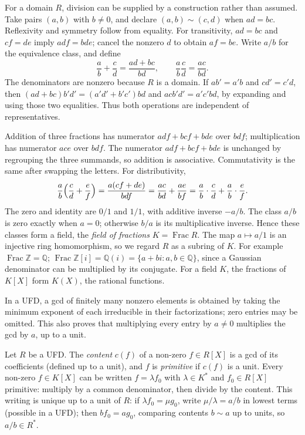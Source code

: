 For a domain $R$, division can be supplied by a construction rather
than assumed. Take pairs $(a,b)$ with $b\ne0$, and declare
$(a,b)\sim(c,d)$ when $ad=bc$. Reflexivity and symmetry follow
from equality. For transitivity, $ad=bc$ and $cf=de$ imply
$adf=bde$; cancel the nonzero $d$ to obtain $af=be$.
Write $a/b$ for the equivalence class, and define
\[
\frac ab+\frac cd=\frac{ad+bc}{bd},\qquad
\frac ab\frac cd=\frac{ac}{bd}.
\]
The denominators are nonzero because $R$ is a domain.
If $ab'=a'b$ and $cd'=c'd$, then
$(ad+bc)b'd'=(a'd'+b'c')bd$ and
$acb'd'=a'c'bd$, by expanding and using those two equalities.
Thus both operations are independent of representatives.

Addition of three fractions has numerator $adf+bcf+bde$ over
$ bdf$; multiplication has numerator $ace$ over $bdf$.
The numerator $adf+bcf+bde$ is unchanged by regrouping the three summands, so addition is associative. Commutativity is the same after swapping the letters. For distributivity,
\[
\frac ab\Bigl(\frac cd+\frac ef\Bigr)
=\frac{a(cf+de)}{bdf}
=\frac{ac}{bd}+\frac{ae}{bf}
=\frac ab\cdot\frac cd+\frac ab\cdot\frac ef.
\] The zero and identity are $0/1$ and
$1/1$, with additive inverse $-a/b$. The class $a/b$ is zero exactly
when $a=0$; otherwise $b/a$ is its multiplicative inverse.
Hence these classes form a field, the \emph{field of fractions}
$K=\operatorname{Frac}R$. The map $a\mapsto a/1$ is an injective
ring homomorphism, so we regard $R$ as a subring of $K$.
For example $\operatorname{Frac}\mathbb Z=\mathbb Q$;
$\operatorname{Frac}\mathbb Z[i]=\mathbb Q(i)=\{a+bi:a,b\in\mathbb Q\}$,
since a Gaussian denominator can be multiplied by its conjugate.
For a field $K$, the fractions of $K[X]$ form $K(X)$, the rational functions.

In a UFD, a gcd of finitely many nonzero elements is obtained by taking
the minimum exponent of each irreducible in their factorizations; zero
entries may be omitted. This also proves that multiplying every entry
by $a\ne0$ multiplies the gcd by $a$, up to a unit.

Let $R$ be a UFD. The \emph{content} $c(f)$ of a non-zero $f\in R[X]$ is a gcd of its coefficients (defined up to a unit), and $f$ is \emph{primitive} if $c(f)$ is a unit. Every non-zero $f\in K[X]$ can be written $f=\lambda f_0$ with $\lambda\in K^*$ and $f_0\in R[X]$ primitive: multiply by a common denominator, then divide by the content. This writing is unique up to a unit of $R$: if $\lambda f_0=\mu g_0$, write $\mu/\lambda=a/b$ in lowest terms (possible in a UFD); then $bf_0=ag_0$, comparing contents $b\sim a$ up to units, so $a/b\in R^*$.

